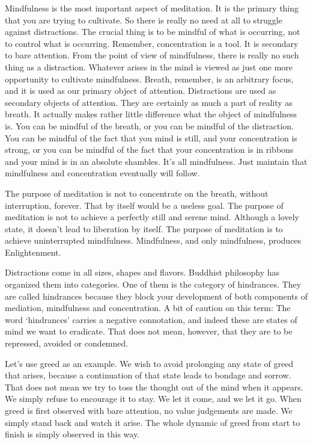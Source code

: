Mindfulness is the most important aspect of meditation. It is the primary thing
that you are trying to cultivate. So there is really no need at all to struggle
against distractions. The crucial thing is to be mindful of what is occurring,
not to control what is occurring. Remember, concentration is a tool. It is
secondary to bare attention. From the point of view of mindfulness, there is
really no such thing as a distraction. Whatever arises in the mind is viewed as
just one more opportunity to cultivate mindfulness.  Breath, remember, is an
arbitrary focus, and it is used as our primary object of attention. Distractions
are used as secondary objects of attention. They are certainly as much a part of
reality as breath. It actually makes rather little difference what the object of
mindfulness is. You can be mindful of the breath, or you can be mindful of the
distraction. You can be mindful of the fact that you mind is still, and your
concentration is strong, or you can be mindful of the fact that your
concentration is in ribbons and your mind is in an absolute shambles. It's all
mindfulness. Just maintain that mindfulness and concentration eventually will
follow.

The purpose of meditation is not to concentrate on the breath, without
interruption, forever. That by itself would be a useless goal.  The purpose of
meditation is not to achieve a perfectly still and serene mind. Although a
lovely state, it doesn't lead to liberation by itself. The purpose of meditation
is to achieve uninterrupted mindfulness. Mindfulness, and only mindfulness,
produces Enlightenment.

Distractions come in all sizes, shapes and flavors. Buddhist philosophy has
organized them into categories. One of them is the category of hindrances. They
are called hindrances because they block your development of both components of
mediation, mindfulness and concentration. A bit of caution on this term: The
word `hindrances' carries a negative connotation, and indeed these are states of
mind we want to eradicate. That does not mean, however, that they are to be
repressed, avoided or condemned.

Let's use greed as an example. We wish to avoid prolonging any state of greed
that arises, because a continuation of that state leads to bondage and sorrow.
That does not mean we try to toss the thought out of the mind when it appears.
We simply refuse to encourage it to stay. We let it come, and we let it go. When
greed is first observed with bare attention, no value judgements are made. We
simply stand back and watch it arise. The whole dynamic of greed from start to
finish is simply observed in this way.

